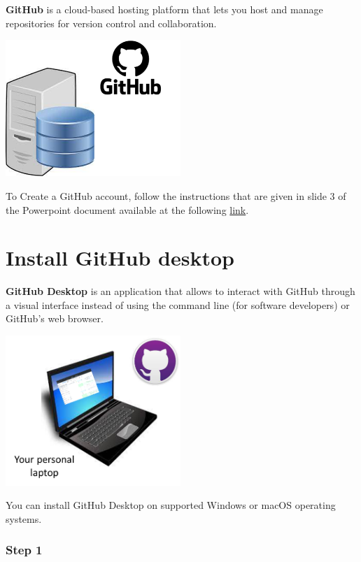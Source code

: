 \documentclass[
  letterpaper,
  DIV=11,
  numbers=noendperiod]{scrreprt}
\begin{document}
\textbf{GitHub} is a cloud-based hosting platform that lets you host and
manage repositories for version control and collaboration.

\includegraphics[width=2.60417in,height=\textheight]{./images/paste-15A58C67.png}

To Create a GitHub account, follow the instructions that are given in
slide 3 of the Powerpoint document available at the following
\href{https://drive.switch.ch/index.php/s/1eFnksrX0UtjfZV}{link}.

\hypertarget{sec-GitHub-Desktop-installation}{%
\section{Install GitHub desktop}\label{sec-GitHub-Desktop-installation}}

\textbf{GitHub Desktop} is an application that allows to interact with
GitHub through a visual interface instead of using the command line (for
software developers) or GitHub's web browser.

\includegraphics[width=2.60417in,height=\textheight]{./images/paste-9238B1AB.png}

You can install GitHub Desktop on supported Windows or macOS operating
systems.

\hypertarget{step-1-5}{%
\subsubsection{Step 1}\label{step-1-5}}
\end{document}
